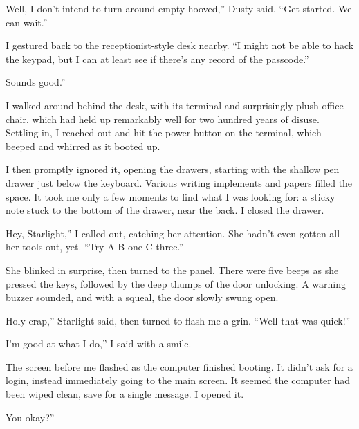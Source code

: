 \leavevmode{}Well, I don’t intend to turn around empty-hooved,” Dusty said. “Get started. We can wait.”

I gestured back to the receptionist-style desk nearby. “I might not be able to hack the keypad, but I can at least see if there’s any record of the passcode.”

\leavevmode{}Sounds good.”

I walked around behind the desk, with its terminal and surprisingly plush office chair, which had held up remarkably well for two hundred years of disuse. Settling in, I reached out and hit the power button on the terminal, which beeped and whirred as it booted up.

I then promptly ignored it, opening the drawers, starting with the shallow pen drawer just below the keyboard. Various writing implements and papers filled the space. It took me only a few moments to find what I was looking for: a sticky note stuck to the bottom of the drawer, near the back. I closed the drawer.

\leavevmode{}Hey, Starlight,” I called out, catching her attention. She hadn’t even gotten all her tools out, yet. “Try A-B-one-C-three.”

She blinked in surprise, then turned to the panel. There were five beeps as she pressed the keys, followed by the deep thumps of the door unlocking. A warning buzzer sounded, and with a squeal, the door slowly swung open.

\leavevmode{}Holy crap,” Starlight said, then turned to flash me a grin. “Well that was quick!”

\leavevmode{}I’m good at what I do,” I said with a smile.

The screen before me flashed as the computer finished booting. It didn’t ask for a login, instead immediately going to the main screen. It seemed the computer had been wiped clean, save for a single message. I opened it.


\leavevmode{}You okay?”

